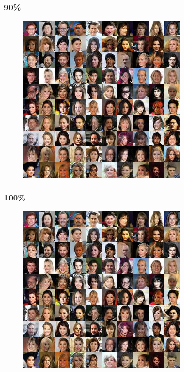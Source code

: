\documentclass[dvipdfmx,12pt]{beamer}
\begin{document}
\begin{frame}
	\frametitle{90\%}
	\begin{figure}[htbp]
	\begin{center}
	\includegraphics[width=0.7\hsize]{./sndcgan/image00090000.png}
	\end{center}
	\end{figure}
\end{frame}
\begin{frame}
	\frametitle{100\%}
	\begin{figure}[htbp]
	\begin{center}
	\includegraphics[width=0.7\hsize]{./sndcgan/image00100000.png}
	\end{center}
	\end{figure}
\end{frame}
\end{document}
